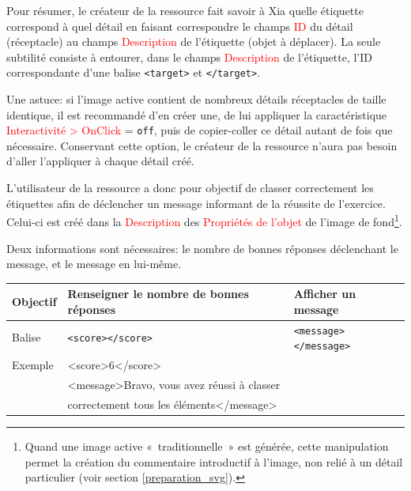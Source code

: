 \documentclass[a4paper,12pt]{report}
\newcommand{\chemin}[1]{\textcolor{red}{#1}}
\begin{document}
Pour résumer, le créateur de la ressource fait savoir à Xia quelle étiquette correspond à quel détail en faisant 
correspondre le champs \chemin{ID} du détail (réceptacle) au champs \chemin{Description} de l'étiquette 
(objet à déplacer). La seule subtilité consiste à entourer, dans le champs \chemin{Description}
de l'étiquette, l'ID correspondante d'une balise \verb|<target>| et \verb|</target>|.

Une astuce: si l'image active contient de nombreux détails réceptacles de taille identique, 
il est recommandé d'en créer une, de lui appliquer la caractéristique \chemin{Interactivité > OnClick} = \verb|off|, 
puis de copier-coller ce détail autant de fois que nécessaire. Conservant cette option, 
le créateur de la ressource n'aura pas besoin d'aller l'appliquer à chaque détail créé.

L'utilisateur de la ressource a donc pour objectif de classer correctement les étiquettes afin de déclencher
un message informant de la réussite de l'exercice. Celui-ci est créé dans la \chemin{Description} des \chemin{Propriétés de l'objet} 
de l'image de fond\footnote{Quand une image active «~traditionnelle~» est générée, cette manipulation
permet la création du commentaire introductif à l'image, non relié à un détail particulier (voir section \ref{preparation_svg}).}.

Deux informations sont nécessaires: le nombre de bonnes réponses déclenchant le message, et le message en lui-même.

\begin{center}
 \begin{tabular}{|l|p{2in}|p{2in}|}
 \hline
  Objectif & Renseigner le nombre de bonnes réponses & Afficher un message\\
  \hline
  Balise & \verb|<score></score>| & \verb|<message></message>|\\
  \hline
  Exemple & \multicolumn{2}{|l|}{<score>6</score>}\\
   & \multicolumn{2}{|l|}{<message>Bravo, vous avez réussi à classer}\\
    & \multicolumn{2}{|l|}{correctement tous les éléments</message>}\\
  \hline
 \end{tabular}

\end{center}
\end{document}
